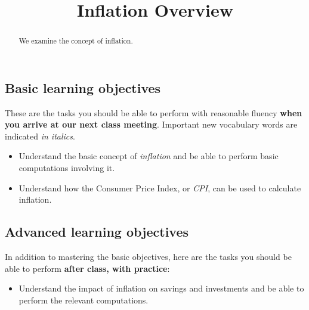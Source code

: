 \documentclass{ximera}
\title{Inflation Overview}
\begin{document}
\begin{abstract}
We examine the concept of inflation.
\end{abstract}
\maketitle

\subsection*{Basic learning objectives}

These are the tasks you should be able to perform with reasonable fluency \textbf{when you arrive at our next class meeting}. Important new vocabulary words are indicated \emph{in italics}. 

\begin{itemize}
	\item  Understand the basic concept of \emph{inflation} and be able to perform basic computations involving it.
    \item Understand how the Consumer Price Index, or \emph{CPI}, can be used to calculate inflation.
\end{itemize}

\subsection*{Advanced learning objectives}

In addition to mastering the basic objectives, here are the tasks you should be able to perform \textbf{after class, with practice}: 

\begin{itemize}
    \item Understand the impact of inflation on savings and investments and be able to perform the relevant computations. 
\end{itemize}
\end{document}
